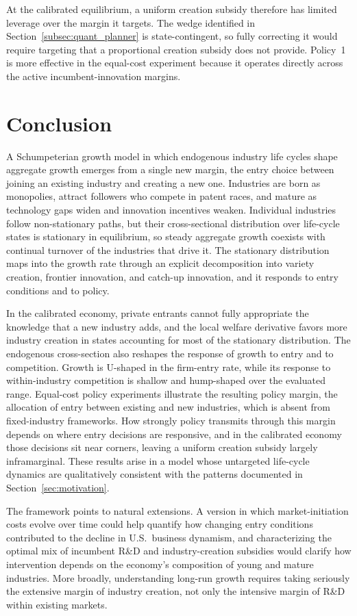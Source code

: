 \documentclass[12pt]{article}
\begin{document}
At the calibrated equilibrium, a uniform creation subsidy therefore has limited leverage over the margin it targets. The wedge identified in Section~\ref{subsec:quant_planner} is state-contingent, so fully correcting it would require targeting that a proportional creation subsidy does not provide. Policy~1 is more effective in the equal-cost experiment because it operates directly across the active incumbent-innovation margins.

\section{Conclusion}\label{sec:conclusion}
A Schumpeterian growth model in which endogenous industry life cycles shape aggregate growth emerges from a single new margin, the entry choice between joining an existing industry and creating a new one. Industries are born as monopolies, attract followers who compete in patent races, and mature as technology gaps widen and innovation incentives weaken. Individual industries follow non-stationary paths, but their cross-sectional distribution over life-cycle states is stationary in equilibrium, so steady aggregate growth coexists with continual turnover of the industries that drive it. The stationary distribution maps into the growth rate through an explicit decomposition into variety creation, frontier innovation, and catch-up innovation, and it responds to entry conditions and to policy.

In the calibrated economy, private entrants cannot fully appropriate the knowledge that a new industry adds, and the local welfare derivative favors more industry creation in states accounting for most of the stationary distribution. The endogenous cross-section also reshapes the response of growth to entry and to competition. Growth is U-shaped in the firm-entry rate, while its response to within-industry competition is shallow and hump-shaped over the evaluated range. Equal-cost policy experiments illustrate the resulting policy margin, the allocation of entry between existing and new industries, which is absent from fixed-industry frameworks. How strongly policy transmits through this margin depends on where entry decisions are responsive, and in the calibrated economy those decisions sit near corners, leaving a uniform creation subsidy largely inframarginal. These results arise in a model whose untargeted life-cycle dynamics are qualitatively consistent with the patterns documented in Section~\ref{sec:motivation}.

The framework points to natural extensions. A version in which market-initiation costs evolve over time could help quantify how changing entry conditions contributed to the decline in U.S.\ business dynamism, and characterizing the optimal mix of incumbent R\&D and industry-creation subsidies would clarify how intervention depends on the economy's composition of young and mature industries. More broadly, understanding long-run growth requires taking seriously the extensive margin of industry creation, not only the intensive margin of R\&D within existing markets.
\end{document}
